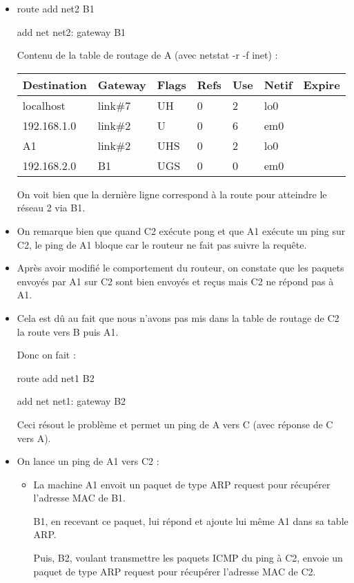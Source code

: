 \documentclass{article}
\begin{document}
\begin{itemize}
\item route add net2 B1

add net net2: gateway B1

Contenu de la table de routage de A (avec netstat -r -f inet) :

\begin{tabular}{|p{2cm}|p{2cm}|p{1cm}|p{1cm}|p{1cm}|p{2cm}|p{2cm}|}
\hline
Destination & Gateway & Flags & Refs & Use & Netif & Expire\\
\hline
localhost & link\#7 & UH & 0 & 2 & lo0 & \\ 
\hline
192.168.1.0 & link\#2 & U & 0 & 6 & em0 & \\ 
\hline
A1 & link\#2 & UHS & 0 & 2 & lo0 & \\ 
\hline
192.168.2.0 & B1 & UGS & 0 & 0 & em0 & \\ 
\hline
\end{tabular}

On voit bien que la dernière ligne correspond à la route pour atteindre le réseau 2 via B1.

\item On remarque bien que quand C2 exécute pong et que A1 exécute un ping sur C2, le ping de A1 bloque car le routeur ne fait pas suivre la requête.

\item Après avoir modifié le comportement du routeur, on constate que les paquets envoyés par A1 sur C2 sont bien envoyés et reçus mais C2 ne répond pas à A1.

\item Cela est dû au fait que nous n'avons pas mis dans la table de routage de C2 la route vers B puis A1.

Donc on fait :

route add net1 B2

add net net1: gateway B2

Ceci résout le problème et permet un ping de A vers C (avec réponse de C vers A).

\item On lance un ping de A1 vers C2 :
	\begin{itemize}
	\item La machine A1 envoit un paquet de type ARP request pour récupérer l'adresse MAC de B1.
	
B1, en recevant ce paquet, lui répond et ajoute lui même A1 dans sa table ARP.

Puis, B2,  voulant transmettre les paquets ICMP du ping à C2, envoie un paquet de type ARP request pour récupérer l'adresse MAC de C2.


\end{itemize}
\end{itemize}
\end{document}

